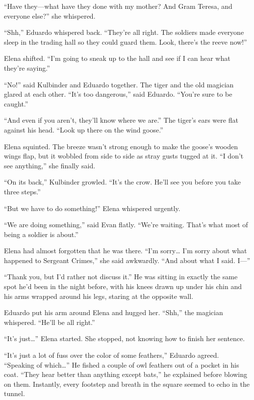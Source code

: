 \documentclass[10pt]{book}
\begin{document}
``Have they---what have they done with my mother? And Gram Teresa, and everyone else?'' she whispered.

``Shh,'' Eduardo whispered back. ``They're all right. The soldiers made everyone sleep in the trading hall so they could guard them. Look, there's the reeve now!''

Elena shifted. ``I'm going to sneak up to the hall and see if I can hear what they're saying.''

``No!'' said Kulbinder and Eduardo together. The tiger and the old magician glared at each other. ``It's too dangerous,'' said Eduardo. ``You're sure to be caught.''

``And even if you aren't, they'll know where we are.'' The tiger's ears were flat against his head. ``Look up there on the wind goose.''

Elena squinted. The breeze wasn't strong enough to make the goose's wooden wings flap, but it wobbled from side to side as stray gusts tugged at it. ``I don't see anything,'' she finally said.

``On its back,'' Kulbinder growled. ``It's the crow. He'll see you before you take three steps.''

``But we have to do something!'' Elena whispered urgently.

``We are doing something,'' said Evan flatly. ``We're waiting. That's what most of being a soldier is about.''

Elena had almost forgotten that he was there. ``I'm sorry{\ldots} I'm sorry about what happened to Sergeant Crimes,'' she said awkwardly. ``And about what I said. I---''

``Thank you, but I'd rather not discuss it.'' He was sitting in exactly the same spot he'd been in the night before, with his knees drawn up under his chin and his arms wrapped around his legs, staring at the opposite wall.

Eduardo put his arm around Elena and hugged her. ``Shh,'' the magician whispered. ``He'll be all right.''

``It's just{\ldots}'' Elena started. She stopped, not knowing how to finish her sentence.

``It's just a lot of fuss over the color of some feathers,'' Eduardo agreed. ``Speaking of which{\ldots}''  He fished a couple of owl feathers out of a pocket in his coat.  ``They hear better than anything except bats,'' he explained before blowing on them. Instantly, every footstep and breath in the square seemed to echo in the tunnel.
\end{document}
